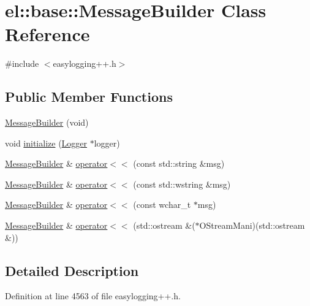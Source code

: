 \hypertarget{classel_1_1base_1_1_message_builder}{}\section{el\+:\+:base\+:\+:Message\+Builder Class Reference}
\label{classel_1_1base_1_1_message_builder}


{\ttfamily \#include $<$easylogging++.\+h$>$}

\subsection*{Public Member Functions}
\begin{DoxyCompactItemize}
\item 
\hyperlink{classel_1_1base_1_1_message_builder_ac0b1b1be970ceab13eb023ef0399ef87}{Message\+Builder} (void)
\item 
void \hyperlink{classel_1_1base_1_1_message_builder_a61729d9b620eb7b3e6ac1af69364553c}{initialize} (\hyperlink{classel_1_1_logger}{Logger} $\ast$logger)
\item 
\hyperlink{classel_1_1base_1_1_message_builder}{Message\+Builder} \& \hyperlink{classel_1_1base_1_1_message_builder_a740a968d7f2901d49a2e1c348cfea7bf}{operator$<$$<$} (const std\+::string \&msg)
\item 
\hyperlink{classel_1_1base_1_1_message_builder}{Message\+Builder} \& \hyperlink{classel_1_1base_1_1_message_builder_ad04c5d0a8fc38662ede9aaa742912a42}{operator$<$$<$} (const std\+::wstring \&msg)
\item 
\hyperlink{classel_1_1base_1_1_message_builder}{Message\+Builder} \& \hyperlink{classel_1_1base_1_1_message_builder_a42c2a21a6bebb2ad52d22da054cd8f49}{operator$<$$<$} (const wchar\+\_\+t $\ast$msg)
\item 
\hyperlink{classel_1_1base_1_1_message_builder}{Message\+Builder} \& \hyperlink{classel_1_1base_1_1_message_builder_a884b9fd5f742f5fa25bbc78d3415a674}{operator$<$$<$} (std\+::ostream \&($\ast$O\+Stream\+Mani)(std\+::ostream \&))
\end{DoxyCompactItemize}


\subsection{Detailed Description}


Definition at line 4563 of file easylogging++.\+h.



